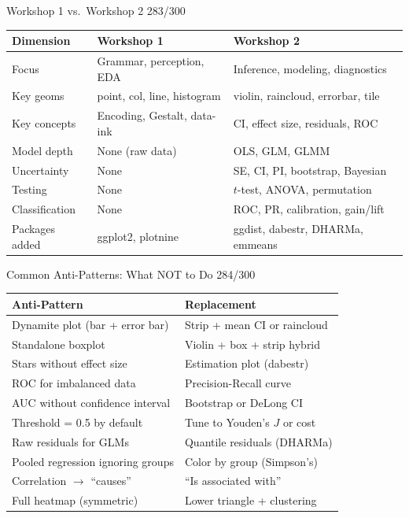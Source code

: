 \documentclass[10pt]{beamer}
\newcommand{\smark}[1]{\hfill{\scriptsize\color{codegray}#1}}
\begin{document}
\begin{frame}{Workshop 1 vs.\ Workshop 2}
\smark{283/300}
\centering\small
\begin{tabular}{@{}lll@{}}
    \toprule
    \textbf{Dimension} & \textbf{Workshop 1} & \textbf{Workshop 2} \\
    \midrule
    Focus           & Grammar, perception, EDA    & Inference, modeling, diagnostics \\
    Key geoms       & point, col, line, histogram  & violin, raincloud, errorbar, tile \\
    Key concepts    & Encoding, Gestalt, data-ink  & CI, effect size, residuals, ROC \\
    Model depth     & None (raw data)              & OLS, GLM, GLMM \\
    Uncertainty     & None                         & SE, CI, PI, bootstrap, Bayesian \\
    Testing         & None                         & $t$-test, ANOVA, permutation \\
    Classification  & None                         & ROC, PR, calibration, gain/lift \\
    Packages added  & ggplot2, plotnine            & ggdist, dabestr, DHARMa, emmeans \\
    \bottomrule
\end{tabular}
\end{frame}

\begin{frame}{Common Anti-Patterns: What NOT to Do}
\smark{284/300}
\centering\small
\begin{tabular}{@{}ll@{}}
    \toprule
    \textbf{Anti-Pattern} & \textbf{Replacement} \\
    \midrule
    Dynamite plot (bar + error bar)       & Strip + mean CI or raincloud \\
    Standalone boxplot                    & Violin + box + strip hybrid \\
    Stars without effect size             & Estimation plot (dabestr) \\
    ROC for imbalanced data               & Precision-Recall curve \\
    AUC without confidence interval       & Bootstrap or DeLong CI \\
    Threshold = 0.5 by default            & Tune to Youden's $J$ or cost \\
    Raw residuals for GLMs                & Quantile residuals (DHARMa) \\
    Pooled regression ignoring groups     & Color by group (Simpson's) \\
    Correlation $\to$ ``causes''          & ``Is associated with'' \\
    Full heatmap (symmetric)              & Lower triangle + clustering \\
    \bottomrule
\end{tabular}
\end{frame}
\end{document}
